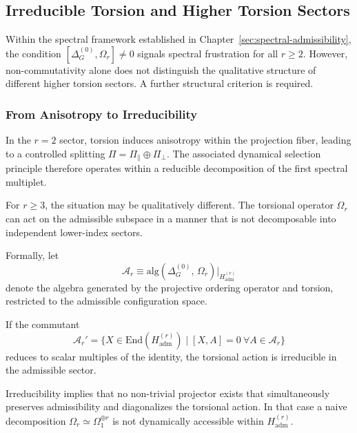 \subsection{Irreducible Torsion and Higher Torsion Sectors}
  \label{sec:irreducible-torsion}

  Within the spectral framework established in Chapter~\ref{sec:spectral-admissibility},
  the condition
  \(
  [\Delta^{(0)}_G,\Omega_r]\neq 0
  \)
  signals spectral frustration for all $r\ge 2$.
  However, non-commutativity alone does not distinguish the qualitative
  structure of different higher torsion sectors.
  A further structural criterion is required.

  \subsubsection*{From Anisotropy to Irreducibility}

    In the $r=2$ sector, torsion induces anisotropy within the projection
    fiber, leading to a controlled splitting
    \(
    \Pi = \Pi_{\parallel}\oplus\Pi_{\perp}.
    \)
    The associated dynamical selection principle therefore operates
    within a reducible decomposition of the first spectral multiplet.

    For $r\ge 3$, the situation may be qualitatively different.
    The torsional operator $\Omega_r$ can act on the admissible subspace
    in a manner that is not decomposable into independent lower-index
    sectors.

    Formally, let
    \begin{equation}
      \mathcal{A}_r
      \equiv
      \mathrm{alg}\!\left(
                      \Delta^{(0)}_G,\,\Omega_r
      \right)
      \Big|_{H_{\mathrm{adm}}^{(r)}}
    \end{equation}
    denote the algebra generated by the projective ordering operator and torsion,
    restricted to the admissible configuration space.

    If the commutant
    \begin{equation}
      \mathcal{A}_r'
      =
      \big\{
      X\in\mathrm{End}(H_{\mathrm{adm}}^{(r)})
      \mid
      [X,A]=0\ \forall A\in\mathcal{A}_r
      \big\}
    \end{equation}
    reduces to scalar multiples of the identity,
    the torsional action is irreducible in the admissible sector.

    Irreducibility implies that no non-trivial projector exists that
    simultaneously preserves admissibility and diagonalizes the torsional
    action.
    In that case a naive decomposition
    \(
    \Omega_r \simeq \Omega_{1}^{\oplus r}
    \)
    is not dynamically accessible within $H_{\mathrm{adm}}^{(r)}$.

